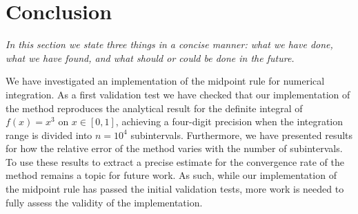 \documentclass[english,notitlepage,reprint,nofootinbib]{revtex4-1}  %
\begin{document}
	
	\section{Conclusion}\label{sec:conclusion}
	\textit{In this section we state three things in a concise manner: what we have done, what we have found, and what should or could be done in the future.}
	
	We have investigated an implementation of the midpoint rule for numerical integration. As a first validation test we have checked that our implementation of the method reproduces the analytical result for the definite integral of $f(x) = x^3$ on $x \in [0,1]$, achieving a four-digit precision when the integration range is divided into $n=10^4$ subintervals. Furthermore, we have presented results for how the relative error of the method varies with the number of subintervals. To use these results to extract a precise estimate for the convergence rate of the method remains a topic for future work. As such, while our implementation of the midpoint rule has passed the initial validation tests, more work is needed to fully assess the validity of the implementation.
	
	\onecolumngrid
	
	
	
	
\end{document}
